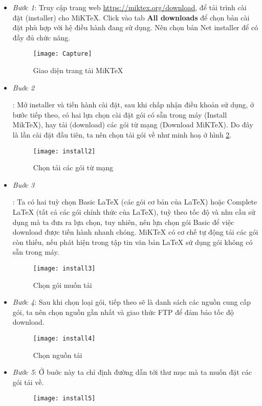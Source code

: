 \begin{itemize}
 \item \textsl{Bước 1}: Truy cập trang web \url{https://miktex.org/download}, để tải trình cài đặt
 (installer) cho MiKTeX. Click vào tab \textbf{All downloads} để chọn bản cài đặt phù hợp với hệ
 điều hành đang sử dụng. Nên chọn bản Net installer để có đầy đủ chức năng.
 \begin{figure}[H]
  \centering
  \texttt{[image: Capture]}
  \caption{Giao diện trang tải MiKTeX}
  \label{fig:web}
 \end{figure}
 \item\hypertarget{step:2}{\textsl{Buớc 2}}: Mở installer và tiến hành cài đặt, sau khi chấp nhận điều khoản sử dụng,
 ở bước tiếp theo, có hai lựa chọn cài đặt gói có sẵn trong máy (Install MikTeX), hay tải (download) các gói từ 
 mạng (Download MiKTeX). Do đây là lần cài đặt đầu tiên, ta nên chọn tải gói về như minh hoạ ở hình \ref{fig:down}.
 \begin{figure}[H]
  \centering
  \texttt{[image: install2]}
  \caption{Chọn tải các gói từ mạng}
  \label{fig:down}
 \end{figure}
 \item \hypertarget{step:3}{\textsl{Buớc 3}}: Ta có hai tuỳ chọn Basic LaTeX (các gói cơ bản của LaTeX) hoặc Complete
 LaTeX (tất cả các gói chính thức của LaTeX), tuỳ theo tốc độ và nhu cầu sử dụng mà ta đưa ra
 lựa chọn, tuy nhiên, nên lựa chọn gói Basic để việc download được tiến hành nhanh chóng. MiKTeX có cơ chế tự động tải các gói còn thiếu, nếu phát hiện trong tập tin văn
 bản LaTeX sử dụng gói không có sẵn trong máy. 
 \begin{figure}[H]
  \centering
  \texttt{[image: install3]}
  \caption{Chọn gói muốn tải}
  \label{fig:set}
 \end{figure}
 \item \textsl{Bước 4}: Sau khi chọn loại gói, tiếp theo sẽ là danh sách các nguồn cung cấp
 gói, ta nên chọn nguồn gần nhất và giao thức FTP để đảm bảo tốc độ download.
 \begin{figure}[H]
  \centering
  \texttt{[image: install4]}
  \caption{Chọn nguồn tải}
  \label{fig:source}
 \end{figure}
 \item \textsl{Bước 5}: Ở buớc này ta chỉ định đường dẫn tới thư mục mà ta muốn đặt các gói tải
 về.
 \begin{figure}[H]
  \centering
  \texttt{[image: install5]}

\end{figure}
\end{itemize}
